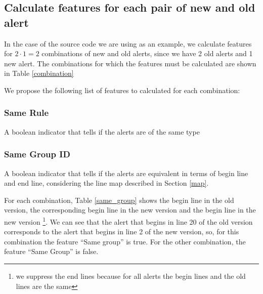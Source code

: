 \documentclass[
]{article}
\begin{document}
\normalsize

\subsection{Calculate features for each pair of new and old alert}

In the case of the source code we are using as an example, we calculate
features for \(2 \cdot 1 = 2\) combinations of new and old alerts, since
we have 2 old alerts and 1 new alert. The combinations for which the
features must be calculated are shown in Table \ref{combination}

\small

\begin{table}[H]

\caption{\label{tab:unnamed-chunk-6}Combinations of new and old alerts for which the features must be calculated \label{combination}}
\centering
{}
\end{table}

\normalsize

We propose the following list of features to calculated for each
combination:

\subsubsection{Same Rule}

A boolean indicator that tells if the alerts are of the same type

\subsubsection{Same Group ID}

A boolean indicator that tells if the alerts are equivalent in terms of
begin line and end line, considering the line map described in Section
\ref{map}.

For each combination, Table \ref{same_group} shows the begin line in the
old version, the corresponding begin line in the new version and the
begin line in the new version
\footnote{we suppress the end lines because for all alerts the begin lines and the old lines are the same}.
We can see that the alert that begins in line 20 of the old version
corresponds to the alert that begins in line 2 of the new version, so,
for this combination the feature ``Same group'' is true. For the other
combination, the feature ``Same Group'' is false.
\end{document}
